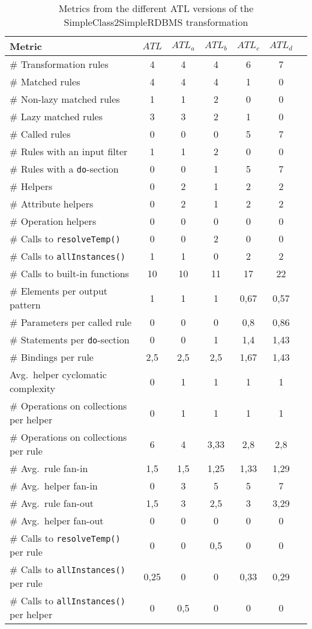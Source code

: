 \begin{table}[htb]
\centering\small
\begin{tabular}{|l|c|c|c|c|c|c|}
\hline
Metric & $ATL$ & $ATL_a$ & $ATL_b$ & $ATL_c$ & $ATL_d$ \\
\hline
\# Transformation rules & 4 & 4 & 4 & 6 & 7 \\
\hline
\# Matched rules & 4 & 4 & 4 & 1 & 0 \\
\hline
\# Non-lazy matched rules & 1 & 1 & 2 & 0 & 0 \\
\hline
\# Lazy matched rules & 3 & 3 & 2 & 1 & 0 \\
\hline
\# Called rules & 0 & 0 & 0 & 5 & 7 \\
\hline
\# Rules with an input filter & 1 & 1 & 2 & 0 & 0 \\
\hline
\# Rules with a \texttt{do}-section & 0 & 0 & 1 & 5 & 7 \\
\hline
\# Helpers & 0 & 2 & 1 & 2 & 2 \\
\hline
\# Attribute helpers & 0 & 2 & 1 & 2 & 2 \\
\hline
\# Operation helpers & 0 & 0 & 0 & 0 & 0 \\
\hline
\# Calls to \texttt{resolveTemp()} & 0 & 0 & 2 & 0 & 0 \\
\hline
\# Calls to \texttt{allInstances()} & 1 & 1 & 0 & 2 & 2 \\
\hline
\# Calls to built-in functions & 10 & 10 & 11 & 17 & 22 \\
\hline
\# Elements per output pattern & 1 & 1 & 1 & 0,67 & 0,57 \\
\hline
\# Parameters per called rule & 0 & 0 & 0 & 0,8 & 0,86 \\
\hline
\# Statements per \texttt{do}-section & 0 & 0 & 1 & 1,4 & 1,43 \\
\hline
\# Bindings per rule & 2,5 & 2,5 & 2,5 & 1,67 & 1,43 \\
\hline
Avg.\ helper cyclomatic complexity & 0 & 1 & 1 & 1 & 1 \\
\hline
\# Operations on collections per helper & 0 & 1 & 1 & 1 & 1 \\
\hline
\# Operations on collections per rule & 6 & 4 & 3,33 & 2,8 & 2,8 \\
\hline
\# Avg.\ rule fan-in & 1,5 & 1,5 & 1,25 & 1,33 & 1,29 \\
\hline
\# Avg.\ helper fan-in & 0 & 3 & 5 & 5 & 7 \\
\hline
\# Avg.\ rule fan-out & 1,5 & 3 & 2,5 & 3 & 3,29 \\
\hline
\# Avg.\ helper fan-out & 0 & 0 & 0 & 0 & 0 \\
\hline
\# Calls to \texttt{resolveTemp()} per rule & 0 & 0 & 0,5 & 0 & 0 \\
\hline
\# Calls to \texttt{allInstances()} per rule & 0,25 & 0 & 0 & 0,33 & 0,29 \\
\hline
\# Calls to \texttt{allInstances()} per helper & 0 & 0,5 & 0 & 0 & 0 \\
\hline
\end{tabular}
\normalsize
\caption{Metrics from the different ATL versions of the SimpleClass2SimpleRDBMS transformation}
\label{tab:metrics:ATL:C2R}
\end{table} 